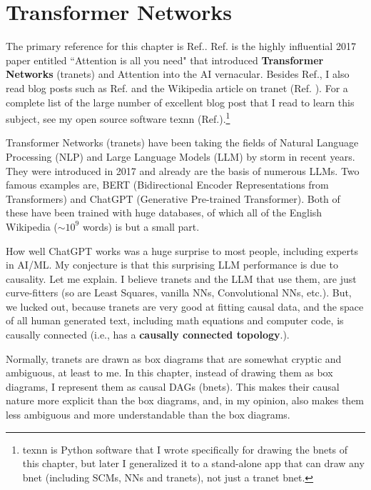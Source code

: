 \chapter{Transformer Networks}
\label{ch-transformer}

The primary reference for this chapter is  Ref.\cite{attention-is-all-you-need}.
Ref.\cite{attention-is-all-you-need} is  
 the highly influential  2017 paper entitled
``Attention is all you need" 
that introduced {\bf Transformer Networks} (tranets) and 
Attention into the AI vernacular.
Besides Ref.\cite{attention-is-all-you-need},
I also read blog posts
such as Ref.\cite{joshi-trans}
and the Wikipedia article on  tranet (Ref. \cite{wiki-transformer}).
For a complete list of the large number
of excellent blog post that I read to learn
this subject, see my open source software texnn
(Ref.\cite{texnn}).\footnote{
texnn is
 Python software 
 that I wrote
specifically for drawing the bnets
of this chapter, but later I 
generalized it to a stand-alone app that can draw
any bnet (including SCMs, NNs and tranets), not just a tranet bnet.}

Transformer Networks (tranets)
have been taking the fields of
Natural Language Processing (NLP)
and Large Language Models (LLM)
by storm in recent years.
They were introduced in 2017 and already
are the basis of numerous LLMs.
Two famous examples are,
BERT (Bidirectional Encoder
Representations from Transformers)
and ChatGPT (Generative Pre-trained Transformer).
Both of these
have been trained with
huge databases,
of which all of
the English Wikipedia ($\sim 10^9$ words)
is but a small part.

How well ChatGPT works was a huge
surprise to most people, including experts in AI/ML.
My conjecture is that this surprising
LLM performance is
 due to causality.
 Let me explain. I believe tranets and the LLM that use them, are just curve-fitters (so are Least Squares, vanilla NNs, Convolutional NNs, etc.). But, we lucked out, because
tranets are very good at fitting causal data, and the space of all human generated text, including math
equations and computer code,
is causally connected (i.e., has
a {\bf causally connected topology}.).

Normally, tranets are
drawn as box diagrams
that are somewhat cryptic and ambiguous, at least to me.
In this chapter,
instead of 
drawing them as box diagrams,
I represent them as causal DAGs (bnets). This makes their
causal nature more explicit than 
the box diagrams, and,
in my opinion, also makes them
less ambiguous  and more understandable than the box diagrams.




